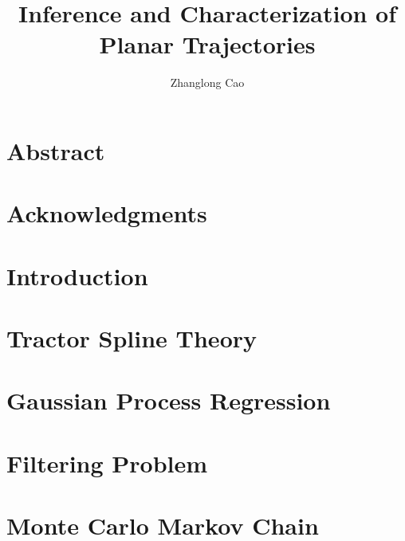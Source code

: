 \documentclass[12pt,twoside]{report}
\title{Inference and Characterization of Planar Trajectories}
\author{Zhanglong Cao}
\date{}
\begin{document}
\frontstuff

\linespread{1.3} \normalsize

\chapter*{}%

\clearemptydoublepage

\chapter*{Abstract}%

\clearemptydoublepage

\chapter*{Acknowledgments}%

\clearemptydoublepage



\chapter{Introduction}

\clearemptydoublepage

\chapter{Tractor Spline Theory}

\clearemptydoublepage

\chapter{Gaussian Process Regression}

\clearemptydoublepage

\chapter{Filtering Problem}

\clearemptydoublepage

\chapter{Monte Carlo Markov Chain}

\clearemptydoublepage
\end{document}
